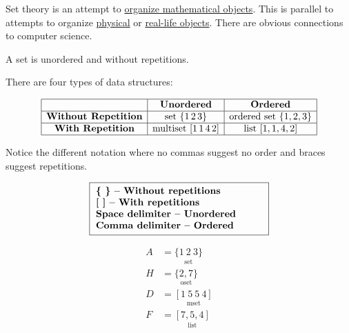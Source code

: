 
Set theory is an attempt to \underline{organize mathematical objects}. This is parallel to attempts to organize \underline{physical} or \underline{real-life objects}. There are obvious connections to computer science.

\begin{definition}
    A set is unordered and without repetitions.
\end{definition}

\vspace{1em}  %

There are four types of data structures:

\[
\begin{array}{|c|c|c|}
    \hline
    & \textbf{Unordered} & \textbf{Ordered} \\
    \hline
    \textbf{Without Repetition} & \text{set } \{1\, 2\, 3\} & \text{ordered set } \{1, 2, 3\} \\
    \hline
    \textbf{With Repetition} & \text{multiset } [1\, 1\, 4\, 2] & \text{list } [1, 1, 4, 2] \\
    \hline
\end{array}
\]

Notice the different notation where no commas suggest no order and braces suggest repetitions.

\[
    \fbox{
    \parbox{0.5\textwidth}{
        \begin{tabular}{@{}l@{}}
        \textbf{\{ \} -- Without repetitions} \\
        \textbf{[ ] -- With repetitions} \\
        \textbf{Space delimiter -- Unordered} \\
        \textbf{Comma delimiter -- Ordered}
        \end{tabular}
    }
}

\]

\[
\begin{aligned}
A &= \underset{\text{set}}{\{1\:2\:3\}} \\
H &= \underset{\text{oset}}{\{2, 7\}} \\
D &= \underset{\text{mset}}{[1\:5\:5\:4]} \\
F &= \underset{\text{list}}{[7, 5, 4]}
\end{aligned}
\]

\vspace{1em}  %

